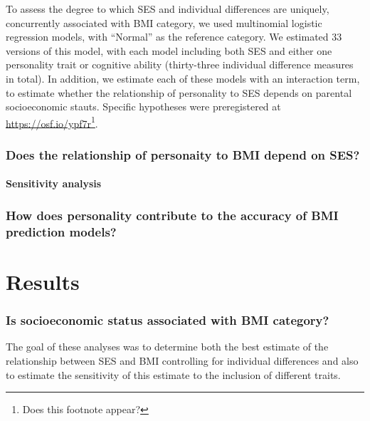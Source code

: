 \documentclass[man]{apa6}
\let\oldparagraph\paragraph
\renewcommand{\paragraph}[1]{\oldparagraph{#1}\mbox{}}
\begin{document}
To assess the degree to which SES and individual differences are uniquely, concurrently associated with BMI category, we used multinomial logistic regression models, with \enquote{Normal} as the reference category. We estimated 33 versions of this model, with each model including both SES and either one personality trait or cognitive ability (thirty-three individual difference measures in total). In addition, we estimate each of these models with an interaction term, to estimate whether the relationship of personality to SES depends on parental socioeconomic stauts. Specific hypotheses were preregistered at \url{https://osf.io/ypf7r}\footnote{Does this footnote appear?}.

\hypertarget{does-the-relationship-of-personaity-to-bmi-depend-on-ses}{%
\subsubsection{Does the relationship of personaity to BMI depend on SES?}\label{does-the-relationship-of-personaity-to-bmi-depend-on-ses}}

\hypertarget{sensitivity-analysis}{%
\paragraph{Sensitivity analysis}\label{sensitivity-analysis}}

\hypertarget{how-does-personality-contribute-to-the-accuracy-of-bmi-prediction-models}{%
\subsubsection{How does personality contribute to the accuracy of BMI prediction models?}\label{how-does-personality-contribute-to-the-accuracy-of-bmi-prediction-models}}

\hypertarget{results}{%
\section{Results}\label{results}}

\hypertarget{is-socioeconomic-status-associated-with-bmi-category}{%
\subsubsection{Is socioeconomic status associated with BMI category?}\label{is-socioeconomic-status-associated-with-bmi-category}}

The goal of these analyses was to determine both the best estimate of the relationship between SES and BMI controlling for individual differences and also to estimate the sensitivity of this estimate to the inclusion of different traits.
\end{document}
